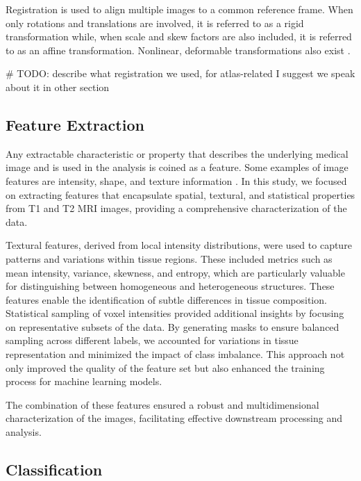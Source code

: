 Registration is used to align multiple images to a common reference frame. When only rotations and translations are involved, it is referred to as a rigid transformation while, when scale and skew factors are also included, it is referred to as an affine transformation. Nonlinear, deformable transformations also exist \cite{b10}.

\# TODO: describe what registration we used, for atlas-related I suggest we speak about it in other section

\subsection{Feature Extraction}

Any extractable characteristic or property that describes the underlying medical image and is used in the analysis is coined as a feature. Some examples of image features are intensity, shape, and texture information \cite{b8}. In this study, we focused on extracting features that encapsulate spatial, textural, and statistical properties from T1 and T2 MRI images, providing a comprehensive characterization of the data.

Textural features, derived from local intensity distributions, were used to capture patterns and variations within tissue regions. These included metrics such as mean intensity, variance, skewness, and entropy, which are particularly valuable for distinguishing between homogeneous and heterogeneous structures. These features enable the identification of subtle differences in tissue composition. Statistical sampling of voxel intensities provided additional insights by focusing on representative subsets of the data. By generating masks to ensure balanced sampling across different labels, we accounted for variations in tissue representation and minimized the impact of class imbalance. This approach not only improved the quality of the feature set but also enhanced the training process for machine learning models.

The combination of these features ensured a robust and multidimensional characterization of the images, facilitating effective downstream processing and analysis.

\subsection{Classification}


